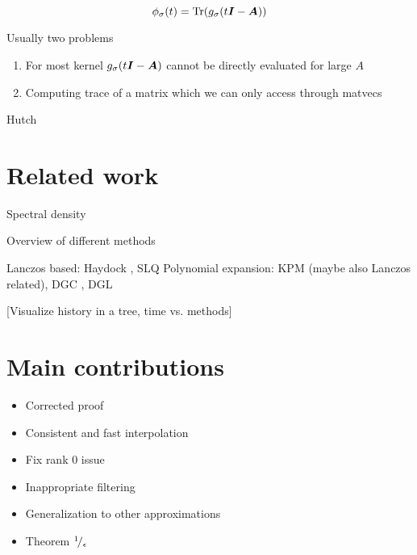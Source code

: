 \begin{equation}
    \phi_{\sigma}(t) = \operatorname{Tr}(g_{\sigma}(t\boldsymbol{I} - \boldsymbol{A})) 
    \label{equ:1-introduction-spectral-density-as-trace}
\end{equation}

Usually two problems

\begin{enumerate}
    \item For most kernel $g_{\sigma}(t\boldsymbol{I} - \boldsymbol{A})$ cannot be directly evaluated for large $A$
    \item Computing trace of a matrix which we can only access through matvecs
\end{enumerate}

Hutch\pp


\section{Related work}
\label{sec:1-introduction-related}

Spectral density \cite{lin2017randomized}

Overview of different methods 

Lanczos based: Haydock \cite{lin2016review}, SLQ \cite{chen2021slq}
Polynomial expansion: KPM \cite{weisse2006kpm} (maybe also Lanczos related), DGC \cite{lin2017randomized}, DGL \cite{lin2016review}

[Visualize history in a tree, time vs. methods]


\section{Main contributions}
\label{sec:1-introduction-contributions}

\begin{itemize}
    \item Corrected proof
    \item Consistent and fast interpolation
    \item Fix rank 0 issue
    \item Inappropriate filtering
    \item Generalization to other approximations
    \item Theorem ${}^{1}\!/_{\epsilon}$
\end{itemize}


